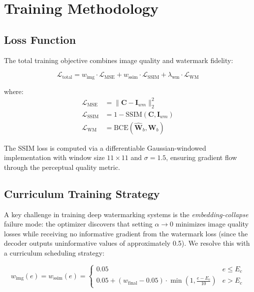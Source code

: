 \documentclass[journal]{IEEEtran}
\begin{document}
\section{Training Methodology}

\subsection{Loss Function}

The total training objective combines image quality and watermark
fidelity:

\begin{equation}
  \mathcal{L}_{\text{total}} = w_{\text{img}} \cdot \mathcal{L}_{\text{MSE}}
  + w_{\text{ssim}} \cdot \mathcal{L}_{\text{SSIM}}
  + \lambda_{\text{wm}} \cdot \mathcal{L}_{\text{WM}}
  \label{eq:total_loss}
\end{equation}

where:
\begin{align}
  \mathcal{L}_{\text{MSE}} &= \|\mathbf{C} - \mathbf{I}_{wm}\|_2^2
  \label{eq:mse_loss}\\
  \mathcal{L}_{\text{SSIM}} &= 1 - \text{SSIM}(\mathbf{C}, \mathbf{I}_{wm})
  \label{eq:ssim_loss}\\
  \mathcal{L}_{\text{WM}} &= \text{BCE}(\hat{\mathbf{W}}_b, \mathbf{W}_b)
  \label{eq:wm_loss}
\end{align}

The SSIM loss is computed via a differentiable Gaussian-windowed
implementation with window size $11 \times 11$ and $\sigma = 1.5$,
ensuring gradient flow through the perceptual quality metric.

\subsection{Curriculum Training Strategy}

A key challenge in training deep watermarking systems is the
\emph{embedding-collapse} failure mode: the optimizer discovers that
setting $\alpha \to 0$ minimizes image quality losses while receiving no
informative gradient from the watermark loss (since the decoder outputs
uninformative values of approximately 0.5). We resolve this with a
curriculum scheduling strategy:

\begin{equation}
  w_{\text{img}}(e) = w_{\text{ssim}}(e) = \begin{cases}
    0.05 & e \leq E_c \\
    0.05 + (w_{\text{final}} - 0.05) \cdot
      \min\!\left(1, \frac{e - E_c}{10}\right) & e > E_c
  \end{cases}
  \label{eq:curriculum}
\end{equation}
\end{document}
